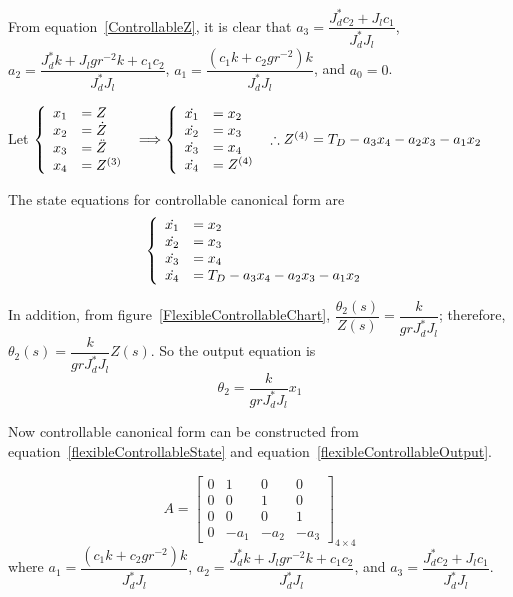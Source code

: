 \documentclass[a4paper, 12pt]{article}
\begin{document}
From equation~\ref{ControllableZ}, it is clear that $a_3 = \dfrac{J_d^*c_2 + J_l c_1}{J_d^*J_l}$, $a_2 = \dfrac{J_d^* k + J_l gr^{-2} k + c_1 c_2}{J_d^* J_l}$, $a_1 = \dfrac{(c_1 k +c_2 gr^{-2})k}{J_d^* J_l} $, and $a_0 = 0$.

Let $\left\{ \begin{array}{l l}
x_1 &= Z	\\
x_2 &= \dot{Z}	\\
x_3	&= \ddot{Z}	\\
x_4 &= Z^{(3)}	\\
\end{array}\right.\ 
\Longrightarrow
\left\{ \begin{array}{l l}
\dot{x_1} &= x_2	\\
\dot{x_2} &= x_3	\\
\dot{x_3}	&= x_4	\\
\dot{x_4} &= Z^{(4)}	\\
\end{array}\right.\ 
 \therefore Z^{(4)} = T_D - a_3 x_4 - a_2 x_3 - a_1 x_2$
 
The state equations for controllable canonical form are
\begin{equation}\label{flexibleControllableState}
\left\{ \begin{array}{l l} 
\dot{x_1} &= x_2\\
\dot{x_2} &= x_3 \\
\dot{x_3} &= x_4\\
\dot{x_4} &= T_D - a_3 x_4 - a_2 x_3 - a_1 x_2
\end{array}\right.\ 
\end{equation}

In addition, from figure~\ref{FlexibleControllableChart}, $\dfrac{\theta_2(s)}{Z(s)} = \dfrac{k}{gr J_d^* J_l}$; therefore, $\theta_2(s) = \dfrac{k}{gr J_d^* J_l} Z(s)$. So the output equation is 
\begin{equation}\label{flexibleControllableOutput}
\theta_2 = \dfrac{k}{gr J_d^* J_l} x_1
\end{equation}

Now controllable canonical form can be constructed from equation~\ref{flexibleControllableState} and equation~\ref{flexibleControllableOutput}. 

\begin{equation}\label{flexibleControllableA}
A = \begin{bmatrix}
0	&	1	&	0	&	0	\\
0	&	0	&	1	&	0	\\
0	&	0	&	0	&	1	\\
0	&	-a_1	&	-a_2	&	-a_3
\end{bmatrix}_{4\times 4}
\end{equation}
where $a_1 = \dfrac{(c_1 k +c_2 gr^{-2})k}{J_d^* J_l} $, $a_2 = \dfrac{J_d^* k + J_l gr^{-2} k + c_1 c_2}{J_d^* J_l}$, and $a_3 = \dfrac{J_d^*c_2 + J_l c_1}{J_d^*J_l}$.
\end{document}
